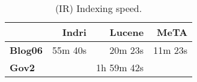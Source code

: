 \begin{table}[t]
\centering
{\small
\begin{tabular}{|l|r|r|r|}
        \hline & \textbf{Indri} & \textbf{Lucene} & \textbf{MeTA} \\
        \hline
        \textbf{Blog06} & 55m 40s & 20m 23s & 11m 23s \\
        \textbf{Gov2}   & & 1h 59m 42s & \\
        \hline
\end{tabular}
\caption{(IR) Indexing speed.}
\label{table:ir-indexing}
}
\end{table}
